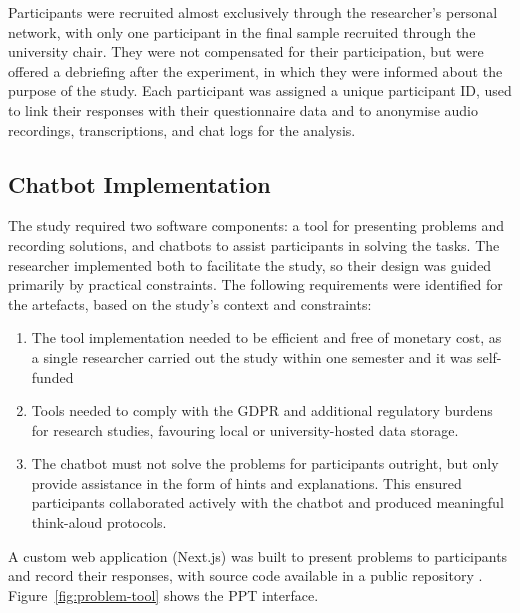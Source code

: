 \endgroup

Participants were recruited almost exclusively through the researcher's personal network, with only one participant in the final sample recruited through the university chair. They were not compensated for their participation, but were offered a debriefing after the experiment, in which they were informed about the purpose of the study. Each participant was assigned a unique participant ID, used to link their responses with their questionnaire data and to anonymise audio recordings, transcriptions, and chat logs for the analysis.

\subsection{Chatbot Implementation} \label{ssec:chatbot-implementation}

The study required two software components: a tool for presenting problems and recording solutions, and chatbots to assist participants in solving the tasks. The researcher implemented both to facilitate the study, so their design was guided primarily by practical constraints. The following requirements were identified for the artefacts, based on the study's context and constraints:

\begin{enumerate}[label=(\textbf{R\arabic*}),leftmargin=3em]
    \item The tool implementation needed to be efficient and free of monetary cost, as a single researcher carried out the study within one semester and it was self-funded
    \item Tools needed to comply with the \ac{GDPR} and additional regulatory burdens for research studies, favouring local or university-hosted data storage.
    \pagebreak
    \item The chatbot must not solve the problems for participants outright, but only provide assistance in the form of hints and explanations. This ensured participants collaborated actively with the chatbot and produced meaningful think-aloud protocols.
\end{enumerate}

A custom web application (Next.js) was built to present problems to participants and record their responses, with source code available in a public repository \parencite{Goepfert2025}. Figure~\ref{fig:problem-tool} shows the \ac{PPT} interface.

